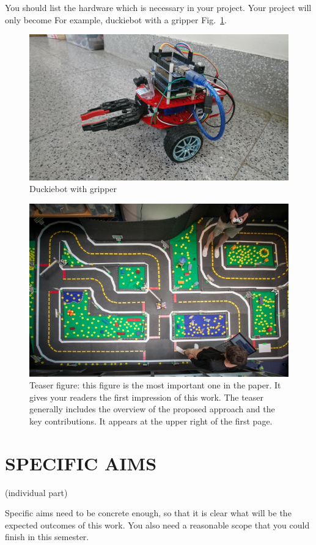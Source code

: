 \documentclass[letterpaper, 10 pt, conference]{ieeeconf}  %
\begin{document}
You should list the hardware which is necessary in your project. Your project will only become For example, duckiebot with a gripper Fig.~\ref{figure:duckiebot_gripper}.
\begin{figure}[h] %
\includegraphics[width=0.8\columnwidth]{duckiebot_gripper}
\centering
\caption{Duckiebot with gripper}
 \label{figure:duckiebot_gripper}
\end{figure}

\begin{figure}[t] %
\includegraphics[width=0.8\columnwidth]{duck}
\centering
\caption{Teaser figure: this figure is the most important one in the paper. It gives your readers the first impression of this work. The teaser generally includes the overview of the proposed approach and the key contributions. It appears at the upper right of the first page.}
\end{figure}

\section{SPECIFIC AIMS}

(individual part)

Specific aims need to be concrete enough, so that it is clear what will be the expected outcomes of this work. You also need a reasonable scope that you could finish in this semester.
\end{document}
